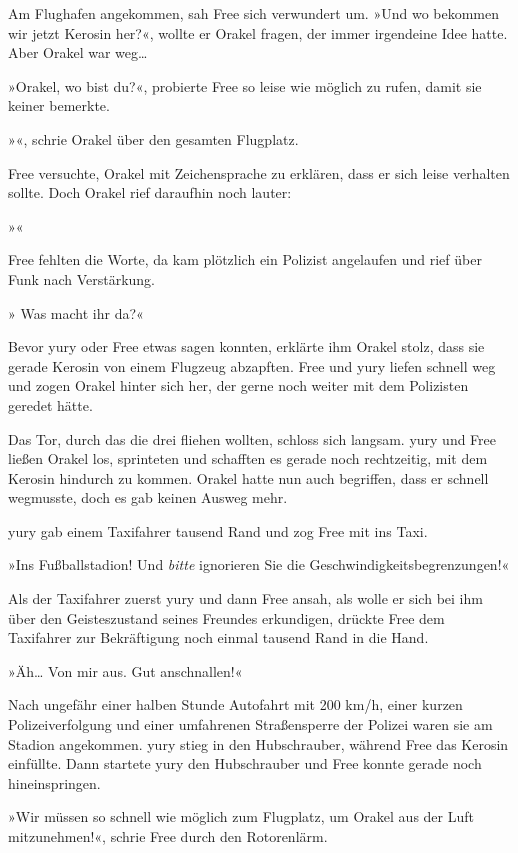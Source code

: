 Am Flughafen angekommen, sah Free sich verwundert um. »Und wo bekommen wir jetzt Kerosin her?«, wollte er Orakel fragen, der immer irgendeine Idee hatte. Aber Orakel war weg…

»Orakel, wo bist du?«, probierte Free so leise wie möglich zu rufen, damit sie keiner bemerkte.

»«, schrie Orakel über den gesamten Flugplatz.

Free versuchte, Orakel mit Zeichensprache zu erklären, dass er sich leise verhalten sollte. Doch Orakel rief daraufhin noch lauter:

»«

Free fehlten die Worte, da kam plötzlich ein Polizist angelaufen und rief über Funk nach Verstärkung.

» Was macht ihr da?«

Bevor yury oder Free etwas sagen konnten, erklärte ihm Orakel stolz, dass sie gerade Kerosin von einem Flugzeug abzapften. Free und yury liefen schnell weg und zogen Orakel hinter sich her, der gerne noch weiter mit dem Polizisten geredet hätte.

Das Tor, durch das die drei fliehen wollten, schloss sich langsam. yury und Free ließen Orakel los, sprinteten und schafften es gerade noch rechtzeitig, mit dem Kerosin hindurch zu kommen. Orakel hatte nun auch begriffen, dass er schnell wegmusste, doch es gab keinen Ausweg mehr.

yury gab einem Taxifahrer tausend Rand und zog Free mit ins Taxi.

»Ins Fußballstadion! Und \textit{bitte} ignorieren Sie die Geschwindigkeitsbegrenzungen!«

Als der Taxifahrer zuerst yury und dann Free ansah, als wolle er sich bei ihm über den Geisteszustand seines Freundes erkundigen, drückte Free dem Taxifahrer zur Bekräftigung noch einmal tausend Rand in die Hand.

»Äh… Von mir aus. Gut anschnallen!«

Nach ungefähr einer halben Stunde Autofahrt mit 200 km/h, einer kurzen Polizeiverfolgung und einer umfahrenen Straßensperre der Polizei waren sie am Stadion angekommen. yury stieg in den Hubschrauber, während Free das Kerosin einfüllte. Dann startete yury den Hubschrauber und Free konnte gerade noch hineinspringen.

»Wir müssen so schnell wie möglich zum Flugplatz, um Orakel aus der Luft mitzunehmen!«, schrie Free durch den Rotorenlärm.


